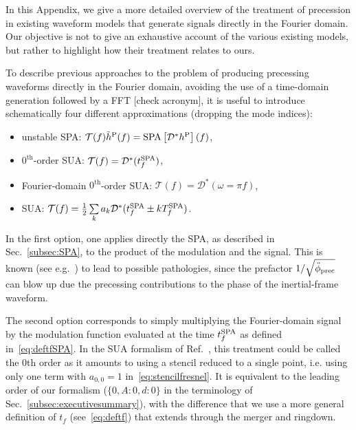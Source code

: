 \documentclass[aps,showpacs,twocolumn,
prd,superscriptaddress,nofootinbib]{revtex4-1}
\newcommand\calT{{\mathcal{T}}}
\newcommand\calD{{\mathcal{D}}}
\newcommand{\Tf}{T_{f}}
\newcommand{\tfSPA}{t_{f}^{\rm SPA}}
\newcommand{\SM}[1]{{\color{Red} #1}}
\begin{document}
In this Appendix, we give a more detailed overview of the treatment of precession in existing waveform models that generate signals directly in the Fourier domain. Our objective is not to give an exhaustive account of the various existing models, but rather to highlight how their treatment relates to ours.

To describe previous approaches to the problem of producing precessing waveforms directly in the Fourier domain, avoiding the use of a time-domain generation followed by a FFT \SM{[check acronym]}, it is useful to introduce schematically four different approximations (dropping the mode indices):
\begin{itemize}
	\item unstable SPA: $\calT(f) \tilde{h}^{\rm P}(f) = \mathrm{SPA}\left[ \calD^{*} h^{\rm P} \right](f)$,
	\item $0^{\text{th}}$-order SUA: $\calT(f) = \calD^{*}(\tfSPA) $,
	\item Fourier-domain $0^{\text{th}}$-order SUA: $\calT(f) = \calD^{*}(\omega = \pi f ) $,
	\item SUA: $\calT(f) = \frac{1}{2} \sum\limits_{k} a_{k} \calD^{*}(\tfSPA \pm k \Tf^{\rm SPA})$.
\end{itemize}

In the first option, one applies directly the SPA, as described in Sec.~\ref{subsec:SPA}, to the product of the modulation and the signal. This is known (see e.g.~\cite{KCY13}) to lead to possible pathologies, since the prefactor $1/\sqrt{\ddot{\phi}_{\rm prec}}$ can blow up due the precessing contributions to the phase of the inertial-frame waveform.

The second option corresponds to simply multiplying the Fourier-domain signal by the modulation function evaluated at the time $\tfSPA$ as defined in~\eqref{eq:deftfSPA}. In the SUA formalism of Ref.~\cite{KCY14}, this treatment could be called the 0th order as it amounts to using a stencil reduced to a single point, i.e. using only one term with $a_{0,0} = 1$ in~\eqref{eq:stencilfresnel}. It is equivalent to the leading order of our formalism ($\{0, A:0, d:0 \}$ in the terminology of Sec.~\ref{subsec:executivesummary}), with the difference that we use a more general definition of $t_{f}$ (see~\eqref{eq:deftf}) that extends through the merger and ringdown.
\end{document}
